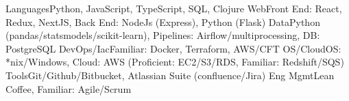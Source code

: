 \begin{additionals}
  \addional
    {Languages}{Python, JavaScript, TypeScript, SQL, Clojure}
  \addional
    {Web}{Front End: React, Redux, NextJS, Back End: NodeJs (Express), Python (Flask)}
  \addional
    {Data}{Python (pandas/statsmodels/scikit-learn), Pipelines: Airflow/multiprocessing, DB: PostgreSQL}
  \addional
    {DevOps/Iac}{Familiar: Docker, Terraform, AWS/CFT}
  \addional
    {OS/Cloud}{OS: *nix/Windows, Cloud: AWS (Proficient: EC2/S3/RDS, Familiar: Redshift/SQS)}
  \addional
    {Tools}{Git/Github/Bitbucket, Atlassian Suite (confluence/Jira)}
  \addional
    {Eng Mgmt}{Lean Coffee, Familiar: Agile/Scrum}
\end{additionals}


